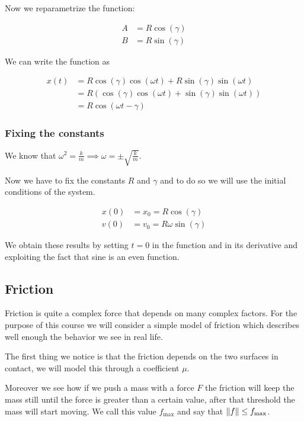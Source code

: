 \documentclass[10pt]{extarticle}
\begin{document}
Now we reparametrize the function:

\begin{align*}
    A & = R \cos(\gamma) \\
    B & = R \sin(\gamma)
\end{align*}

We can write the function as

\begin{align*}
    x(t) & = R \cos(\gamma) \cos(\omega t) + R \sin(\gamma) \sin(\omega t)              \\
         & = R \left( \cos(\gamma) \cos(\omega t) + \sin(\gamma) \sin(\omega t) \right) \\
         & = R \cos(\omega t - \gamma)
\end{align*}

\subsubsection{Fixing the constants}

We know that $\omega^2 = \frac{k}{m} \implies \omega = \pm \sqrt{\frac{k}{m}}$.

Now we have to fix the constants $R$ and $\gamma$ and to do so we will use the initial conditions of the system.

\begin{align*}
    x(0) & = x_0 = R \cos(\gamma)        \\
    v(0) & = v_0 = R \omega \sin(\gamma)
\end{align*}

We obtain these results by setting $t = 0$ in the function and in its derivative and exploiting the fact that sine is an even function.

\subsection{Friction}

Friction is quite a complex force that depends on many complex factors. For the purpose of this course we will consider a simple model of friction which describes well enough the behavior we see in real life.

The first thing we notice is that the friction depends on the two surfaces in contact, we will model this through a coefficient $\mu$.

Moreover we see how if we push a mass with a force $F$ the friction will keep the mass still until the force is greater than a certain value, after that threshold the mass will start moving.
We call this value $f_{\text{max}}$ and say that $\norm{f} \leq f_{\text{max}}$.
\end{document}
